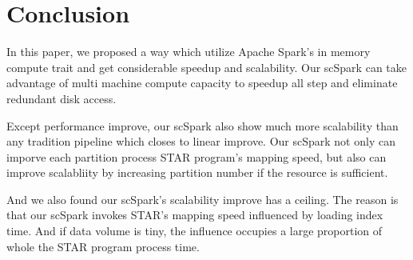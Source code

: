 \documentclass[runningheads]{llncs}
\begin{document}
\section{Conclusion}
In this paper, we proposed a way which utilize Apache Spark's in memory compute trait and get considerable speedup and scalability.
Our scSpark can take advantage of multi machine compute capacity to speedup all step and eliminate redundant disk access.

Except performance improve, our scSpark also show much more scalability than any tradition pipeline which closes to linear improve.
Our scSpark not only can imporve each partition process STAR program's mapping speed, but also can improve scalabliity by increasing partition number if the resource is sufficient.

And we also found our scSpark's scalability improve has a ceiling.
The reason is that our scSpark invokes STAR's mapping speed influenced by loading index time.
And if data volume is tiny, the influence occupies a large proportion of whole the STAR program process time.
\end{document}
